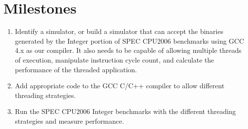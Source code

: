 \documentclass[12pt,twoside,letterpaper]{article}
\begin{document}
\section*{Milestones}
\begin{enumerate}
\item Identify a simulator, or build a simulator that can accept the binaries generated by the Integer portion of SPEC CPU2006 benchmarks using GCC 4.x as our compiler. It also needs to be capable of allowing multiple threads of execution, manipulate instruction cycle count, and calculate the performance of the threaded application.
\item Add appropriate code to the GCC C/C++ compiler to allow different threading strategies.
\item Run the SPEC CPU2006 Integer benchmarks with the different threading strategies and measure performance.
\end{enumerate}


\end{document}
